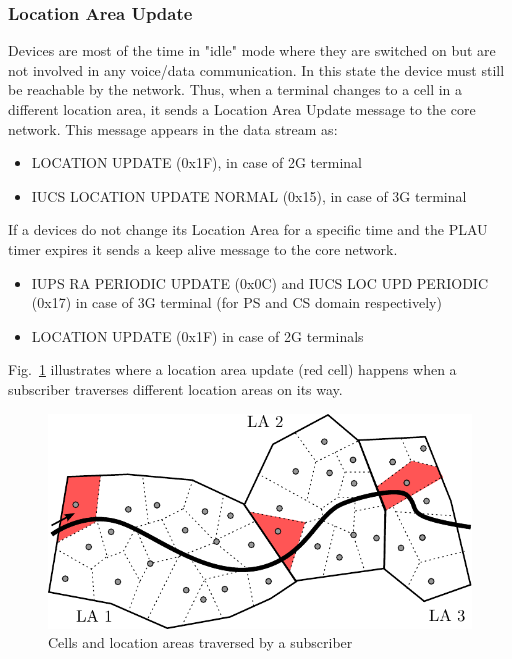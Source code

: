 \documentclass[master,english]{hgbthesis}
\begin{document}
\subsubsection{Location Area Update}
Devices are most of the time in "idle" mode where they are switched on but are not involved in any voice/data communication. In this state the device must still be reachable by the network. Thus, when a terminal changes to a cell in a different location area, it sends a Location Area Update message to the core network.
This message appears in the data stream as:
\begin{itemize}
	\item LOCATION UPDATE (0x1F), in case of 2G terminal
	\item IUCS LOCATION UPDATE NORMAL (0x15), in case of 3G terminal
\end{itemize}
If a devices do not change its Location Area for a specific time and the PLAU timer expires it sends a keep alive message to the core network.
\begin{itemize}
	\item IUPS RA PERIODIC UPDATE (0x0C) and IUCS LOC UPD PERIODIC
	      (0x17) in case of 3G terminal (for PS and CS domain respectively)
	\item LOCATION UPDATE (0x1F) in case of 2G terminals
\end{itemize}
Fig.~\ref{fig:latraversed} illustrates where a location area update (red cell) happens when a subscriber traverses different location areas on its way.
% 
\begin{figure}
	\centering
	\includegraphics[width=\linewidth]{./images/laupdate.pdf}
	\caption{Cells and location areas traversed by a subscriber} 
	\label{fig:latraversed}
\end{figure}
\end{document}
